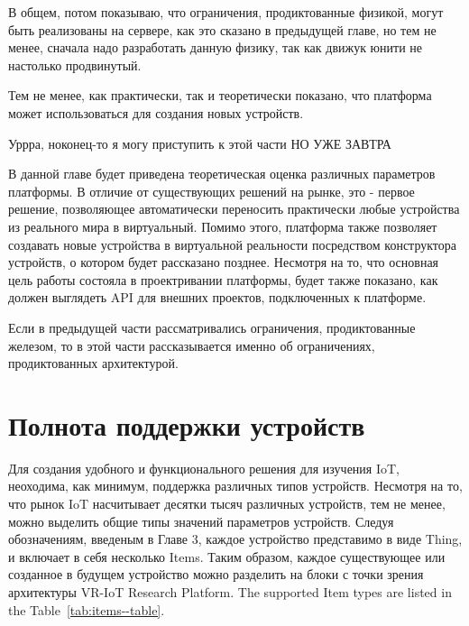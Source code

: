 В общем, потом показываю, что ограничения, продиктованные физикой, могут быть реализованы на сервере, как это сказано в предыдущей главе, но тем не менее, сначала надо разработать данную физику, так как движук юнити не настолько продвинутый.

Тем не менее, как практически, так и теоретически показано, что платформа может использоваться для создания новых устройств.



Уррра, ноконец-то я могу приступить к этой части НО УЖЕ ЗАВТРА


В данной главе будет приведена теоретическая оценка различных параметров платформы. В отличие от существующих решений на рынке, это - первое решение, позволяющее автоматически переносить практически любые устройства из реального мира в виртуальный. Помимо этого, платформа также позволяет создавать новые устройства в виртуальной реальности посредством конструктора устройств, о котором будет рассказано позднее. Несмотря на то, что основная цель работы состояла в проектривании платформы, будет также показано, как должен выглядеть API для внешних проектов, подключенных к платформе.

Если в предыдущей части рассматривались ограничения, продиктованные железом, то в этой части рассказывается именно об ограничениях, продиктованных архитектурой.

\section{Полнота поддержки устройств}

Для создания удобного и функционального решения для изучения IoT, неоходима, как минимум, поддержка различных типов устройств. Несмотря на то, что рынок IoT насчитывает десятки тысяч различных устройств, тем не менее, можно выделить общие типы значений параметров устройств. Следуя обозначениям, введеным в Главе 3, каждое устройство представимо в виде Thing, и включает в себя несколько Items. Таким образом, каждое существующее или созданное в будущем устройство можно разделить на блоки с точки зрения архитектуры VR-IoT Research Platform. The supported Item types are listed in the  Table~\ref{tab:items--table}.

